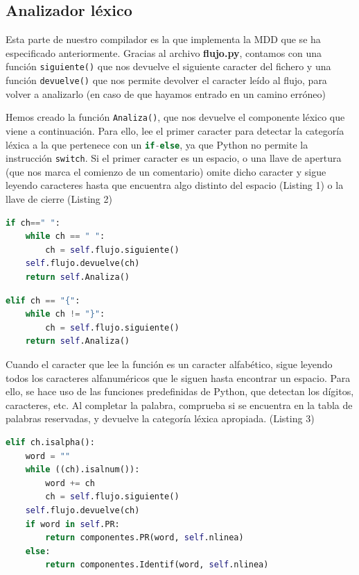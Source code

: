 \documentclass[11pt]{article}
\begin{document}
\subsection{Analizador léxico}
Esta parte de nuestro compilador es la que implementa la MDD que se ha especificado anteriormente. Gracias al archivo \textbf{flujo.py}, contamos con una función \lstinline[language=Python]{siguiente()} que nos devuelve el siguiente caracter del fichero y una función \lstinline[language=Python]{devuelve()} que nos permite devolver el caracter leído al flujo, para volver a analizarlo (en caso de que hayamos entrado en un camino erróneo)

Hemos creado la función \lstinline[language=Python]{Analiza()}, que nos devuelve el componente léxico que viene a continuación. Para ello, lee el primer caracter para detectar la categoría léxica a la que pertenece con un \lstinline[language=Python]{if-else}, ya que Python no permite la instrucción \lstinline[language=Python]{switch}. Si el primer caracter es un espacio, o una llave de apertura (que nos marca el comienzo de un comentario) omite dicho caracter y sigue leyendo caracteres hasta que encuentra algo distinto del espacio (Listing 1) o la llave de cierre (Listing 2)

\begin{lstlisting}[language=Python, caption=Omisión de espacios]
	if ch==" ":
    while ch == " ":
    	ch = self.flujo.siguiente()
    self.flujo.devuelve(ch)
    return self.Analiza()
\end{lstlisting}

\begin{lstlisting}[language=Python, caption=Tratamiento de comentarios]
	elif ch == "{":
    while ch != "}":
    	ch = self.flujo.siguiente()
    return self.Analiza()
\end{lstlisting}

Cuando el caracter que lee la función es un caracter alfabético, sigue leyendo todos los caracteres alfanuméricos que le siguen hasta encontrar un espacio. Para ello, se hace uso de las funciones predefinidas de Python, que detectan los dígitos, caracteres, etc. Al completar la palabra, comprueba si se encuentra en la tabla de palabras reservadas, y devuelve la categoría léxica apropiada. (Listing 3)

\begin{lstlisting}[language=Python, caption=Detección de palabras]
	elif ch.isalpha():
    word = ""
    while ((ch).isalnum()):
    	word += ch
    	ch = self.flujo.siguiente()
    self.flujo.devuelve(ch)
    if word in self.PR:
    	return componentes.PR(word, self.nlinea)
    else:
    	return componentes.Identif(word, self.nlinea)
\end{lstlisting}
\end{document}
